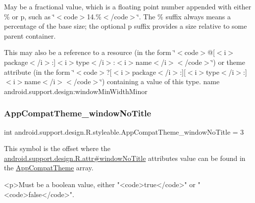 May be a fractional value, which is a floating point number appended with either \% or p, such as \char`\"{}$<$code$>$14.\%$<$/code$>$\char`\"{}. The \% suffix always means a percentage of the base size; the optional p suffix provides a size relative to some parent container. 

This may also be a reference to a resource (in the form \char`\"{}$<$code$>$@\mbox{[}$<$i$>$package$<$/i$>$\+:\mbox{]}$<$i$>$type$<$/i$>$\+:$<$i$>$name$<$/i$>$$<$/code$>$\char`\"{}) or theme attribute (in the form \char`\"{}$<$code$>$?\mbox{[}$<$i$>$package$<$/i$>$\+:\mbox{]}\mbox{[}$<$i$>$type$<$/i$>$\+:\mbox{]}$<$i$>$name$<$/i$>$$<$/code$>$\char`\"{}) containing a value of this type.  name android.\+support.\+design\+:window\+Min\+Width\+Minor \mbox{\label{classandroid_1_1support_1_1design_1_1R_1_1styleable_a81be05150eed15a8c4c447e2e4871635}} 
\subsubsection{\texorpdfstring{App\+Compat\+Theme\+\_\+window\+No\+Title}{AppCompatTheme\_windowNoTitle}}
{\footnotesize\ttfamily int android.\+support.\+design.\+R.\+styleable.\+App\+Compat\+Theme\+\_\+window\+No\+Title = 3\hspace{0.3cm}{\ttfamily [static]}}

This symbol is the offset where the \hyperlink{classandroid_1_1support_1_1design_1_1R_1_1attr_a9dc70da163b81fffb9b6eb85e61ee72f}{android.\+support.\+design.\+R.\+attr\#window\+No\+Title} attribute\textquotesingle{}s value can be found in the \hyperlink{classandroid_1_1support_1_1design_1_1R_1_1styleable_afb351dc8de20cbd4c89abe360373010c}{App\+Compat\+Theme} array.

\begin{DoxyVerb}      <p>Must be a boolean value, either "<code>true</code>" or "<code>false</code>".
\end{DoxyVerb}
 

